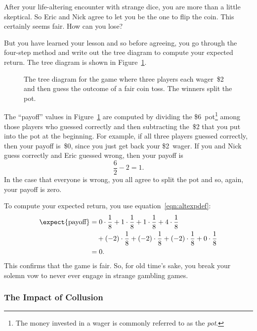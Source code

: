 After your life-altering encounter with strange dice, you are more
than a little skeptical.  So Eric and Nick agree to let you be the one
to flip the coin.  This certainly seems fair.  How can you lose?

But you have learned your lesson and so before agreeing, you go
through the four-step method and write out the tree diagram to compute
your expected return.  The tree diagram is shown in
Figure~\ref{fig:17E1}.

\begin{figure}


\caption{The tree diagram for the game where three players each
  wager~\$2 and then guess the outcome of a fair coin toss.  The
  winners split the pot.}

\label{fig:17E1}

\end{figure}

The ``payoff'' values in Figure~\ref{fig:17E1} are computed by
dividing the \$6~pot\footnote{The money invested in a wager is
  commonly referred to as the \emph{pot}.} among those players who
guessed correctly and then subtracting the~\$2 that you put into the
pot at the beginning.  For example, if all three players guessed
correctly, then your payoff is~\$0, since you just get back your
\$2~wager.  If you and Nick guess correctly and Eric guessed wrong,
then your payoff is
\begin{equation*}
    \frac{6}{2} - 2 = 1.
\end{equation*}
In the case that everyone is wrong, you all agree to split the pot
and so, again, your payoff is zero.

To compute your expected return, you use
equation~\eqref{eqn:altexpdef}:
\begin{align*}
\expect{\text{payoff}}
    &= 0 \cdot \frac{1}{8} + 1 \cdot \frac{1}{8} + 1 \cdot \frac{1}{8}
        + 4 \cdot \frac{1}{8} \\
        & \quad {}+ (-2) \cdot \frac{1}{8} + (-2) \cdot \frac{1}{8}
        + (-2) \cdot \frac{1}{8}
        + 0 \cdot \frac{1}{8} \\
    &= 0.
\end{align*}
This confirms that the game is fair.  So, for old time's sake, you
break your solemn vow to never ever engage in strange gambling games.

\subsubsection{The Impact of Collusion}

